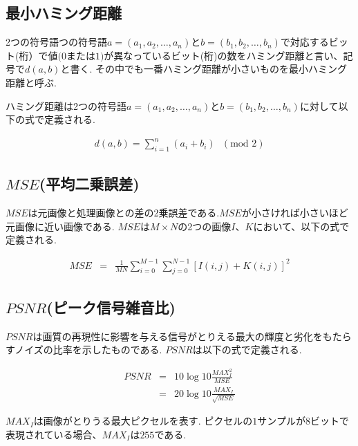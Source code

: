 \documentclass{thesis}
\begin{document}
\subsection{最小ハミング距離}

2つの符号語つの符号語$a=(a_1,a_2,…,a_n)$と$b=(b_1,b_2,…,b_n)$で対応するビット(桁）で値$(0$または$1)$が異なっているビット(桁)の数をハミング距離と言い、記号で$d(a,b)$と書く.
その中でも一番ハミング距離が小さいものを最小ハミング距離と呼ぶ.

ハミング距離は2つの符号語$a=(a_1,a_2,…,a_n)$と$b=(b_1,b_2,…,b_n)$に対して以下の式で定義される.

\begin{eqnarray}
d(a,b)=\sum_{i=1}^{n}(a_{i}+b_{i})\mbox{ }(\mbox{mod } 2)
\end{eqnarray}


\subsection{$MSE$(平均二乗誤差)}

$MSE$は元画像と処理画像との差の2乗誤差である.$MSE$が小さければ小さいほど元画像に近い画像である.
$MSE$は$M \times N$の2つの画像$I、K$において、以下の式で定義される.

\begin{eqnarray}
MSE&=&\frac{1}{MN}\sum_{i=0}^{M-1}\sum_{j=0}^{N-1}[I(i,j)+K(i,j)]^2
\end{eqnarray}


\subsection{$PSNR$(ピーク信号雑音比)}

$PSNR$は画質の再現性に影響を与える信号がとりえる最大の輝度と劣化をもたらすノイズの比率を示したものである.
$PSNR$は以下の式で定義される.

\begin{eqnarray}
PSNR&=&10\log{10}\frac{MAX_I^2}{MSE} \\
       &=&20\log{10}\frac{MAX_I}{\sqrt{MSE}}
\end{eqnarray}

$MAX_{I}$は画像がとりうる最大ピクセルを表す.
ピクセルの$1$サンプルが$8$ビットで表現されている場合、$MAX_{I}$は$255$である.
\end{document}
